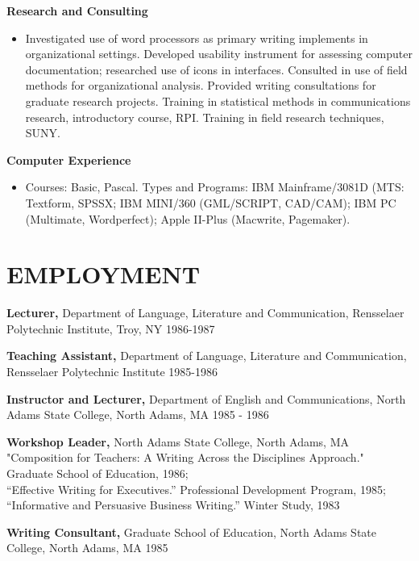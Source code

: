 \begin{resume}
   {\bf  Research and Consulting} 
        \begin{itemize}
        \item[]  Investigated use of word processors as primary writing 
        implements in organizational settings. Developed 
        usability instrument for assessing computer 
        documentation; researched use of icons in interfaces. 
        Consulted in use of field methods for organizational 
        analysis. Provided writing consultations for graduate 
        research projects. Training in statistical methods in 
        communications research, introductory course, RPI. 
        Training in field research techniques, SUNY. 
       \end{itemize} 

   {\bf Computer Experience} 
        \begin{itemize}
        \item[] Courses: Basic, Pascal. Types and Programs: IBM 
        Mainframe/3081D (MTS: Textform, SPSSX; IBM MINI/360 
        (GML/SCRIPT, CAD/CAM); IBM PC (Multimate, Wordperfect); 
        Apple II-Plus (Macwrite, Pagemaker). 
        \end{itemize}
 
\section{EMPLOYMENT} 
\vspace{0.1in} 
    {\bf Lecturer,} Department of Language, Literature and 
    Communication, Rensselaer Polytechnic Institute, Troy, NY 
    1986-1987 
 
    {\bf Teaching Assistant,} Department of Language, Literature and 
    Communication, Rensselaer Polytechnic Institute  1985-1986 
 
    {\bf Instructor and Lecturer,} Department of English and 
    Communications, North Adams State College, North Adams, MA 
    1985 - 1986 
 
    {\bf Workshop Leader,} North Adams State College, North Adams, MA \\
    "Composition for Teachers: A Writing Across the Disciplines 
    Approach." Graduate School of Education, 1986; \\
    ``Effective Writing for Executives.'' Professional Development 
    Program, 1985; ``Informative and Persuasive Business Writing.''
    Winter Study, 1983 
 
    {\bf Writing Consultant,} Graduate School of Education, North Adams 
    State College, North Adams, MA  1985 
 

\end{resume}
